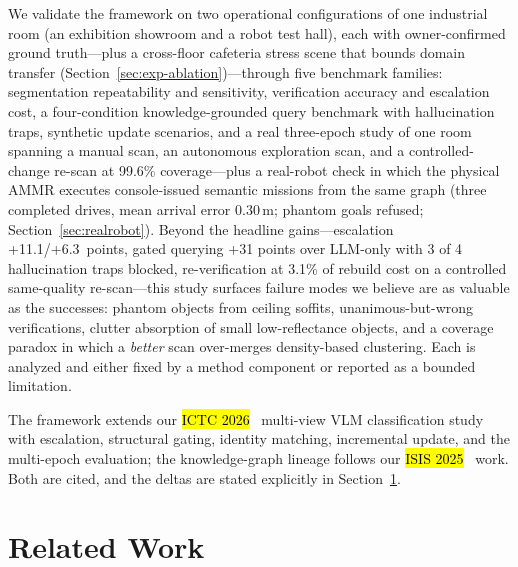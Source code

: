 \documentclass[electronics,article,accept,pdftex,moreauthors]{Definitions/mdpi}
\begin{document}
We validate the framework on two operational configurations of one
industrial room (an exhibition showroom and a robot test hall), each with
owner-confirmed ground truth---plus a cross-floor cafeteria stress scene
that bounds domain transfer (Section~\ref{sec:exp-ablation})---through five
benchmark families: segmentation
repeatability and sensitivity, verification accuracy and escalation cost, a
four-condition knowledge-grounded query benchmark with hallucination traps,
synthetic update scenarios, and a real three-epoch study of one room spanning
a manual scan, an autonomous exploration scan, and a controlled-change
re-scan at 99.6\% coverage---plus a real-robot check in which the
physical AMMR executes console-issued semantic missions from the same
graph (three completed drives, mean arrival error 0.30\,m; phantom goals
refused; Section~\ref{sec:realrobot}). Beyond the headline gains---escalation
\mbox{+11.1/+6.3 points}, gated querying +31 points over LLM-only with 3 of 4
hallucination traps blocked,
re-verification at 3.1\% of rebuild cost on a controlled same-quality
re-scan---this study surfaces
failure modes we believe are as valuable as the successes: phantom objects
from ceiling soffits, unanimous-but-wrong verifications, clutter absorption
of small low-reflectance objects, and a coverage paradox in which a
\emph{better} scan over-merges density-based clustering. Each is analyzed
and either fixed by a method component or reported as a bounded limitation.

The framework extends our \hl{ICTC 2026}~\cite{kim2026ictc} %
 multi-view VLM classification study with
escalation, structural gating, identity matching, incremental update, and
the multi-epoch evaluation; the knowledge-graph lineage follows our \hl{ISIS 2025}~\cite{kim2025isis} %
work. Both are cited, and the deltas are stated explicitly in
Section~\ref{sec:related}.


\section{Related Work}
\label{sec:related}
\end{document}
